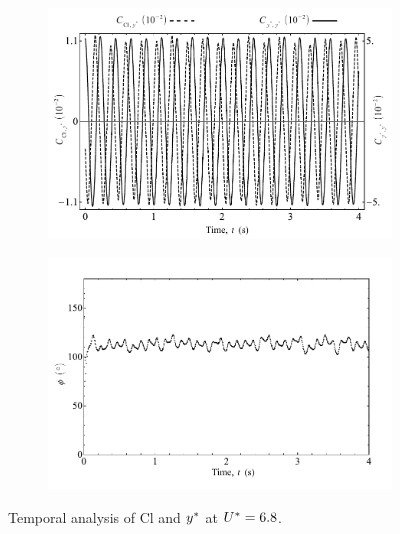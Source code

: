 \documentclass[oneside]{utmthesis}
\begin{document}
\begin{figure}
  \centering
  \begin{subfigure}[h]{1\textwidth}
    \includegraphics[width=\textwidth]{figs/tempAnalysisUpper-a}
    \caption{}
    \label{fig:tempAnalysisUpper-a}
  \end{subfigure}

  \begin{subfigure}[h]{1\textwidth}
    \includegraphics[width=\textwidth]{figs/tempAnalysisUpper-b}
    \caption{}
    \label{fig:tempAnalysisUpper-b}
  \end{subfigure}
  \caption{Temporal analysis of Cl and $y^{*}$ at $U^{*} = 6.8$.}
\end{figure}
\end{document}
